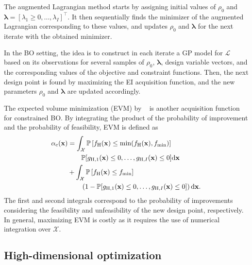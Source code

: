 \documentclass[iicol,sn-basic]{sn-jnl}%
\theoremstyle{thmstyleone}%
\theoremstyle{thmstyletwo}
\theoremstyle{thmstylethree}
\begin{document}
\begin{linenumbers}
The augmented Lagrangian method starts by assigning initial values of $\rho_0$ and $\boldsymbol{\lambda}=[\lambda_1 \geq 0,\dots,\lambda_I]^\intercal$.
It then sequentially finds the minimizer of the augmented Lagrangian corresponding to these values, and updates $\rho_0$ and $\boldsymbol{\lambda}$ for the next iterate with the obtained minimizer.

In the BO setting, the idea is to construct in each iterate a GP model for $\mathcal{L}$ based on its observations for several samples of $\rho_0$, $\boldsymbol{\lambda}$, design variable vectors, and the corresponding values of the objective and constraint functions.
Then, the next design point is found by maximizing the EI acquisition function, and the new parameters $\rho_0$ and $\boldsymbol{\lambda}$ are updated accordingly. 

The expected volume minimization (EVM) by ~\cite{Picheny2014} is another acquisition function for constrained BO.
By integrating the product of the probability of improvement and the probability of feasibility, EVM is defined as
\begin{equation}\label{Eq67}          
	\begin{aligned}
		\alpha_\text{c}({\bf x}) & = \int_{\mathcal{X}} \mathbb{P}\left[f_\text{H}({\bf x}) \leq \min(f_\text{H}({\bf x}),f_{\min})\right]\\ 
		& \qquad \mathbb{P}[g_{\text{H},1}({\bf x}) \leq 0,\dots,g_{\text{H},I}({\bf x}) \leq 0] \text{d}{\bf x}  \\
		& + \int_{\mathcal{X}} \mathbb{P}\left[f_\text{H}({\bf x}) \leq f_{\min}\right]\\
		& \qquad \left(1-\mathbb{P}[g_{\text{H},1}({\bf x}) \leq 0,\dots,g_{\text{H},I}({\bf x}) \leq 0]\right) \text{d}{\bf x}.
	\end{aligned} 
\end{equation}
The first and second integrals correspond to the probability of improvements considering the feasibility and unfeasibility of the new design point, respectively.
In general, maximizing EVM is costly as it requires the use of numerical integration over $\mathcal{X}$.

\subsection{High-dimensional optimization}\label{Sec72}


\end{linenumbers}
\end{document}
